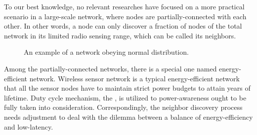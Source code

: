 To our best knowledge, no relevant researches have focused on a more 
practical scenario in a large-scale network, where nodes are partially-connected
with each other. In other words, a node can only discover a fraction of nodes of the
total network in its limited radio sensing range, which can be called its neighbors.





 
 
 

 
 \begin{figure}[!t]
\centering
{}
\vspace{0.03in}
\caption{An example of a network obeying normal distribution.}
\label{NDexample}
\end{figure}
 
 

Among the partially-connected networks, there is a special 
one named energy-efficient network.
Wireless sensor network is a typical energy-efficient network that all the sensor nodes have to maintain 
strict power budgets to attain years of lifetime\cite{dunkels2011contikimac}.
Duty cycle mechanism, the , is utilized to power-awareness ought to be fully taken into consideration.
Correspondingly, the neighbor discovery process needs adjustment to deal with the dilemma between 
a balance of energy-efficiency and low-latency.




